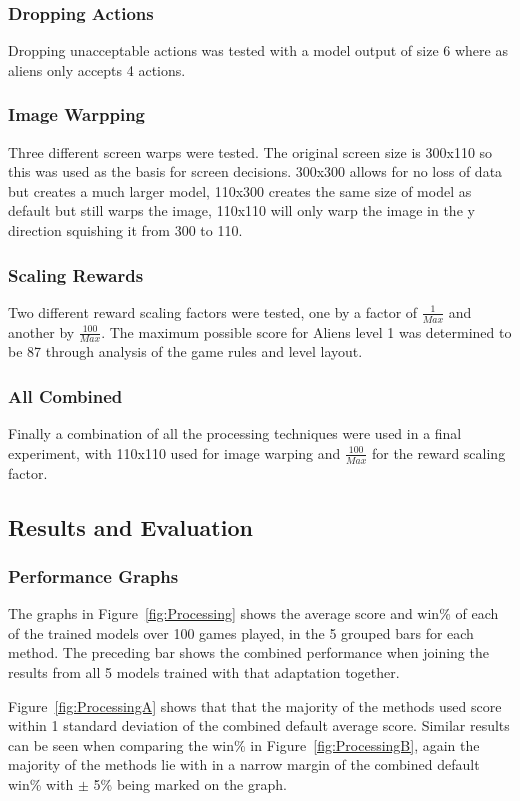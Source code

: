 \subsubsection{Dropping Actions}
Dropping unacceptable actions was tested with a model output of size 6 where as aliens only accepts 4 actions.
\subsubsection{Image Warpping}
Three different screen warps were tested. The original screen size is 300x110 so this was used as the basis for screen decisions.
300x300 allows for no loss of data but creates a much larger model, 110x300 creates the same size of model as default but still warps the image, 110x110 will only warp the image in the y direction squishing it from 300 to 110.
\subsubsection{Scaling Rewards}
Two different reward scaling factors were tested, one by a factor of $\frac{1}{Max}$ and another by $\frac{100}{Max}$.
The maximum possible score for Aliens level 1 was determined to be 87 through analysis of the game rules and level layout.
\subsubsection{All Combined}
\label{sssec:allCombined}
Finally a combination of all the processing techniques were used in a final experiment, with 110x110 used for image warping and $\frac{100}{Max}$ for the reward scaling factor.

\subsection{Results and Evaluation}
\subsubsection{Performance Graphs}
The graphs in Figure~\ref{fig:Processing} shows the average score and win\% of each of the trained models over 100 games played, in the 5 grouped bars for each method.
The preceding bar shows the combined performance when joining the results from all 5 models trained with that adaptation together.
\par
Figure~\ref{fig:ProcessingA} shows that that the majority of the methods used score within 1 standard deviation of the combined default average score.
Similar results can be seen when comparing the win\% in Figure~\ref{fig:ProcessingB}, again the majority of the methods lie with in a narrow margin of the combined default win\% with $\pm$ 5\% being marked on the graph.

